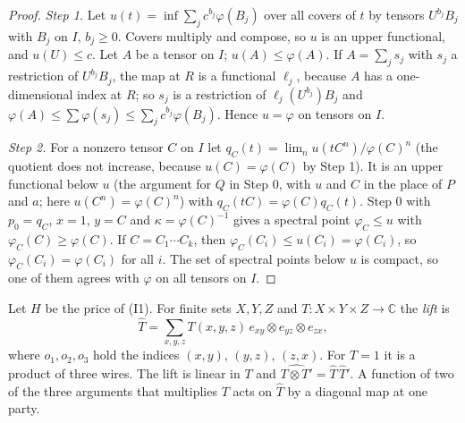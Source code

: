 \documentclass[11pt]{article}
\theoremstyle{definition}
\newcommand{\C}{\mathbb C}
\begin{document}
\begin{proof}
\emph{Step 1.} Let $u(t)=\inf\sum_jc^{b_j}\varphi(B_j)$ over all covers of $t$ by tensors $U^{b_j}B_j$ with $B_j$ on $I$, $b_j\ge0$. Covers multiply and compose, so $u$ is an upper functional, and $u(U)\le c$. Let $A$ be a tensor on $I$; $u(A)\le\varphi(A)$. If $A=\sum_js_j$ with $s_j$ a restriction of $U^{b_j}B_j$, the map at $R$ is a functional $\ell_j$, because $A$ has a one-dimensional index at $R$;
so $s_j$ is a restriction of $\ell_j(U^{b_j})B_j$ and $\varphi(A)\le\sum\varphi(s_j)\le\sum_jc^{b_j}\varphi(B_j)$. Hence $u=\varphi$ on tensors on $I$.

\emph{Step 2.} For a nonzero tensor $C$ on $I$ let $q_C(t)=\lim_nu(tC^n)/\varphi(C)^n$ (the quotient does not increase, because $u(C)=\varphi(C)$ by Step 1). It is an upper functional below $u$ (the argument for $Q$ in Step 0, with $u$ and $C$ in the place of $P$ and $a$; here $u(C^n)=\varphi(C)^n$) with $q_C(tC)=\varphi(C)q_C(t)$. Step 0 with $p_0=q_C$, $x=1$, $y=C$ and $\kappa=\varphi(C)^{-1}$ gives a spectral point $\varphi_C\le u$ with $\varphi_C(C)\ge\varphi(C)$. If $C=C_1\cdots C_k$, then $\varphi_C(C_i)\le u(C_i)=\varphi(C_i)$, so $\varphi_C(C_i)=\varphi(C_i)$ for all $i$. The set of spectral points below $u$ is compact, so one of them agrees with $\varphi$ on all tensors on $I$.
\end{proof}

Let $H$ be the price of (I1). For finite sets $X,Y,Z$ and $T\colon X\times Y\times Z\to\C$ the \emph{lift} is
\[
\hat T=\sum_{x,y,z}T(x,y,z)\,e_{xy}\otimes e_{yz}\otimes e_{zx},
\]
where $o_1,o_2,o_3$ hold the indices $(x,y)$, $(y,z)$, $(z,x)$. For $T=1$ it is a product of three wires. The lift is linear in $T$ and $\widehat{T\otimes T'}=\hat T\,\hat T'$. A function of two of the three arguments that multiplies $T$ acts on $\hat T$ by a diagonal map at one party.
\end{document}
